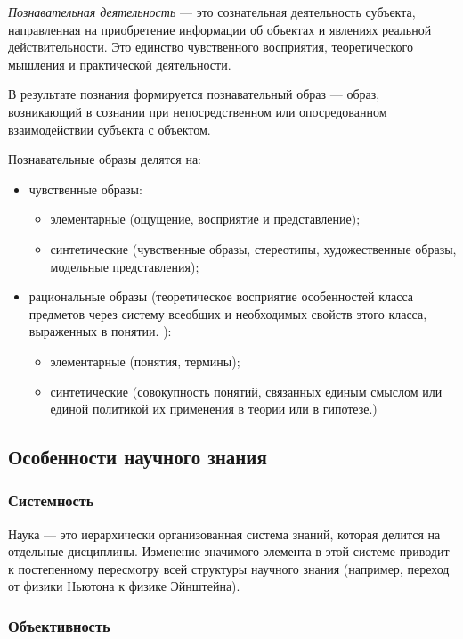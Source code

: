 \textit{Познавательная
деятельность} --- это сознательная деятельность субъекта, направленная на
приобретение информации об объектах и явлениях реальной действительности. Это
единство чувственного восприятия, теоретического мышления и практической
деятельности.  

В результате познания формируется
познавательный образ --- образ, возникающий в сознании при непосредственном или
опосредованном взаимодействии субъекта с объектом.  

Познавательные образы делятся на: 

\begin{itemize}
    \item чувственные образы:
    \begin{itemize}
        \item элементарные (ощущение, восприятие и представление);
        \item синтетические (чувственные образы, стереотипы, художественные образы, модельные представления);
    \end{itemize}
    \item рациональные образы (теоретическое восприятие особенностей класса предметов 
через систему всеобщих и необходимых свойств этого класса, выраженных
в понятии. ):
    \begin{itemize}
        \item элементарные (понятия, термины);
        \item синтетические (совокупность понятий, связанных 
единым смыслом или единой политикой их применения в теории или в гипотезе.)
    \end{itemize}
\end{itemize}

\subsection{Особенности научного знания} 

\subsubsection{Системность} 

Наука --- это иерархически организованная система знаний, которая делится на отдельные дисциплины. Изменение значимого элемента в этой системе приводит к постепенному пересмотру всей структуры научного знания (например, переход от физики Ньютона к физике Эйнштейна).

\subsubsection{Объективность} 

